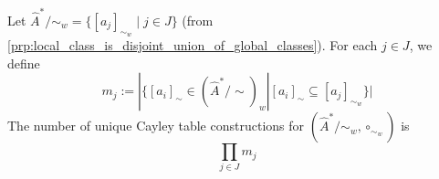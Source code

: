 \begin{propositionE}\label{prp:num_unique_cayley_table_constructions_is_product}
    Let $\hat{A}^{*}/\sim_{w} = \{ [a_{j}]_{\sim_{w}} \mid j \in J \}$ (from \cref{prp:local_class_is_disjoint_union_of_global_classes}).
    For each $j \in J$, we define
    \begin{equation}
        m_{j} := |\{ [a_{i}]_{\sim} \in (\hat{A}^{*}/\sim)_{w} | [a_{i}]_{\sim} \subseteq [a_{j}]_{\sim_{w}} \}|
    \end{equation}
    The number of unique Cayley table constructions for $(\hat{A}^{*}/\sim_{w}, \circ_{\sim_{w}})$ is
    \begin{equation}
        \prod_{j \in J} m_{j}
    \end{equation}
\end{propositionE}
